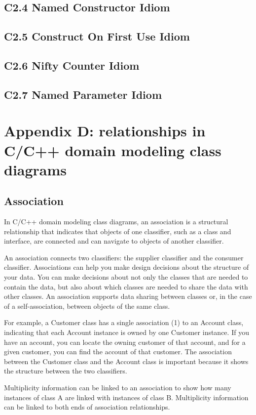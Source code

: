 \documentclass{book}
\begin{document}
\subsection{C2.4 Named Constructor Idiom}\label{nci}
\subsection{C2.5 Construct On First Use Idiom}\label{cofui}
\subsection{C2.6 Nifty Counter Idiom}\label{ncii}
\subsection{C2.7 Named Parameter Idiom}\label{npi}

\section{Appendix D: relationships in C/C++ domain modeling class diagrams}
\subsection{Association}
In C/C++ domain modeling class diagrams, an association is a structural relationship that indicates that objects of one classifier, 
such as a class and interface, are connected and can navigate to objects of another classifier.

An association connects two classifiers: the supplier classifier and the consumer classifier. 
Associations can help you make design decisions about the structure of your data.
You can make decisions about not only the classes that are needed to contain the data, but also about which classes are needed to share the data with other classes.
An association supports data sharing between classes or, in the case of a self-association, between objects of the same class.

For example, a Customer class has a single association (1) to an Account class, indicating that each Account instance is owned by one Customer instance.
If you have an account, you can locate the owning customer of that account, and for a given customer, you can find the account of that customer.
The association between the Customer class and the Account class is important because it shows the structure between the two classifiers.

Multiplicity information can be linked to an association to show how many instances of class A are linked with instances of class B.
Multiplicity information can be linked to both ends of association relationships.
\end{document}
